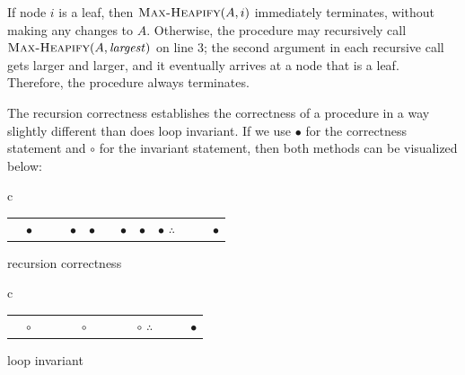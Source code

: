 \begin{enumerate}
\begin{proofinduct}
%
\Term If node $i$ is a leaf, then $\textnormal{\scshape Max-Heapify}(A, i)$ immediately terminates, without making any changes to $A$. Otherwise, the procedure may recursively call $\proc{Max-Heapify}(A, \id{largest})$ on line 3; the second argument in each recursive call gets larger and larger, and it eventually arrives at a node that is a leaf. Therefore, the procedure always terminates.
%
\end{proofinduct}
\begin{remark}
The recursion correctness establishes the correctness of a procedure in a way slightly different than does loop invariant. If we use $\bullet$ for the correctness statement and $\circ$ for the invariant statement, then both methods can be visualized below:
\begin{center}
\begin{tabular}{c}
\begin{tabular}{cccc}
             & $\bullet$ &           &           \cr
             & $\bullet$ & $\bullet$ &           \cr
             & $\bullet$ & $\bullet$ & $\bullet$ \cr\hline
$\therefore$ &           &           & $\bullet$ \cr
\end{tabular}
\cr
recursion correctness \cr
\end{tabular}
\hspace{5em}
\begin{tabular}{c}
\begin{tabular}{cccc}
             & $\circ$ &         &           \cr
             &         & $\circ$ &           \cr
             &         &         & $\circ$   \cr\hline
$\therefore$ &         &         & $\bullet$ \cr
\end{tabular}
\cr
loop invariant \cr
\end{tabular}
\end{center}
\end{remark}
%
\end{enumerate}
